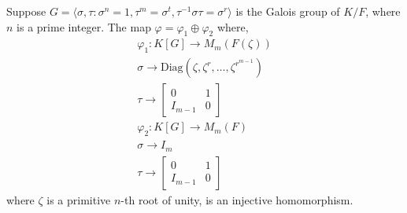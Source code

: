 \begin{lemma}\label{lem:metinjection}
Suppose $G = \langle \sigma , \tau : \sigma^n = 1, \tau^m = \sigma^t, \tau^{-1} \sigma \tau = \sigma^r \rangle$ is the Galois group 
of $K/F$, where $n$ is a prime integer. The map $\varphi = \varphi_1 \oplus \varphi_2$ where,
\begin{equation}
\begin{split}
\varphi_1: K[G] \longrightarrow M_{m}(F(\zeta))\\
\sigma \longrightarrow \mathrm{Diag}(\zeta, \zeta^r, \ldots , \zeta^{r^{m-1}})\\
\tau \longrightarrow 
\left[ \begin{array}{l|l}
0 & 1\\
\hline
I_{m-1}& 0
\end{array} \right] \\
\varphi_2: K[G] \longrightarrow M_m(F) \\
\sigma \longrightarrow I_m \\
\tau \longrightarrow 
\left[ \begin{array}{l|l}
0 & 1\\
\hline
I_{m-1}& 0
\end{array} \right] 
\end{split}
\end{equation}
where $\zeta$ is a primitive $n$-th root of unity, is an injective homomorphism.
\end{lemma}

